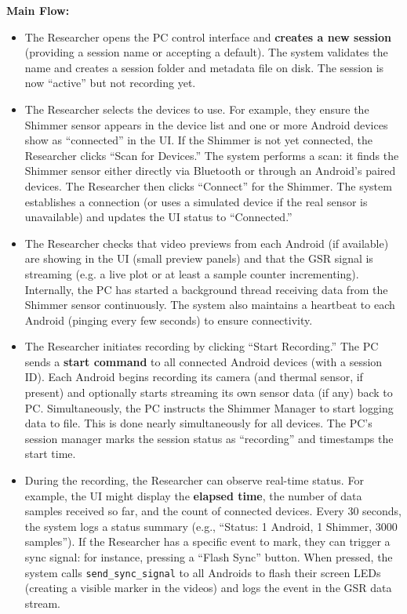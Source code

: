 \textbf{Main Flow:}
\begin{itemize}
  \item The Researcher opens the PC control interface and \textbf{creates a new session} (providing a session name or accepting a default). The system validates the name and creates a session folder and metadata file on disk. The session is now ``active'' but not recording yet.
  \item The Researcher selects the devices to use. For example, they ensure the Shimmer sensor appears in the device list and one or more Android devices show as ``connected'' in the UI. If the Shimmer is not yet connected, the Researcher clicks ``Scan for Devices.'' The system performs a scan: it finds the Shimmer sensor either directly via Bluetooth or through an Android's paired devices. The Researcher then clicks ``Connect'' for the Shimmer. The system establishes a connection (or uses a simulated device if the real sensor is unavailable) and updates the UI status to ``Connected.''
  \item The Researcher checks that video previews from each Android (if available) are showing in the UI (small preview panels) and that the GSR signal is streaming (e.g. a live plot or at least a sample counter incrementing). Internally, the PC has started a background thread receiving data from the Shimmer sensor continuously. The system also maintains a heartbeat to each Android (pinging every few seconds) to ensure connectivity.
  \item The Researcher initiates recording by clicking ``Start Recording.'' The PC sends a \textbf{start command} to all connected Android devices (with a session ID). Each Android begins recording its camera (and thermal sensor, if present) and optionally starts streaming its own sensor data (if any) back to PC. Simultaneously, the PC instructs the Shimmer Manager to start logging data to file. This is done nearly simultaneously for all devices. The PC's session manager marks the session status as ``recording'' and timestamps the start time.
  \item During the recording, the Researcher can observe real-time status. For example, the UI might display the \textbf{elapsed time}, the number of data samples received so far, and the count of connected devices. Every 30 seconds, the system logs a status summary (e.g., ``Status: 1 Android, 1 Shimmer, 3000 samples''). If the Researcher has a specific event to mark, they can trigger a sync signal: for instance, pressing a ``Flash Sync'' button. When pressed, the system calls \texttt{send\_sync\_signal} to all Androids to flash their screen LEDs (creating a visible marker in the videos) and logs the event in the GSR data stream.

\end{itemize}
